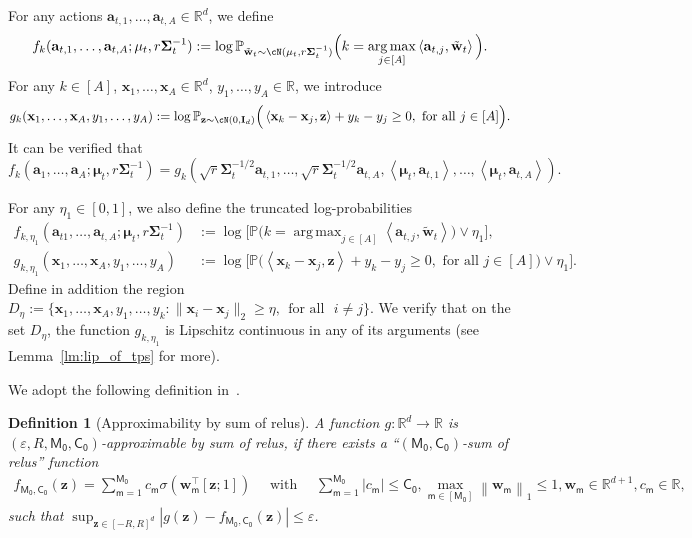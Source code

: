 \documentclass[10pt]{article}
\newtheorem{definition}[theorem]{Definition}
\newcommand{\id}{\bI}
\newcommand{\eps}{\varepsilon}
\DeclareMathOperator*{\argmax}{arg\,max}
\newcommand{\<}{\left\langle}
\renewcommand{\>}{\right\rangle}
\renewcommand{\P}{\mathbb{P}}
\newcommand{\R}{\mathbb{R}}
\newcommand{\Tpsmean}{{{\mathbf\mu}}}
\newcommand{\Tpscov}{{{\mathbf\Sigma}}}
\newcommand{\Tpssam}{{\tilde\bw}}
\newcommand{\Tpsparn}{{r}}
\newcommand{\trunprob}{{\eta_1}}
\newcommand{\Trunreg}{{D}}
\newcommand{\Trunregp}{{\eta}}
\newcommand{\ssm}{{\mathsf{m}}}
\newcommand{\neuron}{{\mathsf{M_0}}}
\newcommand{\weightn}{{{\mathsf{C_0}}}}
\def\bI{{\mathbf I}}
\def\ba{{\mathbf a}}
\def\bw{{\mathbf w}}
\def\bx{{\mathbf x}}
\def\bz{{\mathbf z}}
\begin{document}
For any actions $\ba_{t,1},\ldots,\ba_{t,A}\in\R^{d}$, we define
\begin{align*}
f_k(\ba_{t,1},\ldots,\ba_{t,A};\Tpsmean_t,\Tpsparn\Tpscov_t^{-1}):=\log\P_{\Tpssam_t\sim\cN(\Tpsmean_t,\Tpsparn\Tpscov_t^{-1})}\Big(k =\argmax_{j\in[A]}\<\ba_{t,j},\Tpssam_t\>\Big).
\end{align*}
For any $k\in[A]$, $\bx_1,\ldots,\bx_A\in\R^{d}$, $y_1,\ldots,y_A\in\R$, we introduce $$
g_k(\bx_1,\ldots,\bx_A,y_1,\ldots,y_A):=\log\P_{\bz\sim\cN(0,\id_d)} \Big(\<\bx_k-\bx_j,\bz\>+y_k-y_j\geq0,\text{~for all~}j\in[A] \Big).
$$
It can be verified that $$f_k(\ba_1,\ldots,\ba_A;\Tpsmean_t,\Tpsparn\Tpscov_t^{-1})=g_k(\sqrt{\Tpsparn}\Tpscov_t^{-1/2}\ba_{t,1},\ldots,\sqrt{\Tpsparn}\Tpscov_t^{-1/2}\ba_{t,A},\<\Tpsmean_t,\ba_{t,1}\>,\ldots,\<\Tpsmean_t,\ba_{t,A}\>).$$

For any $\trunprob\in[0,1]$, we also define the truncated log-probabilities
\begin{align*}
f_{k,\trunprob}(\ba_{t1},\ldots,\ba_{t,A};\Tpsmean_t,\Tpsparn\Tpscov_t^{-1})&:=\log\Big[\P \Big( k =\argmax_{j \in[A]}\<\ba_{t,j},\Tpssam_t\> \Big)\vee\trunprob \Big],\\
g_{k,\trunprob}(\bx_1,\ldots,\bx_A,y_1,\ldots,y_A)&:=\log \Big[ \P \Big(\<\bx_k-\bx_j,\bz\>+y_k-y_j\geq0,\text{~for all~}j\in[A] \Big) \vee \trunprob \Big].
\end{align*}
Define in addition the region $\Trunreg_{\Trunregp}:=\{\bx_1,\ldots,\bx_A,y_1,\ldots,y_k: \|\bx_i-\bx_j\|_2\geq\Trunregp,~~\text{for all~~} i\neq j\}$. We verify that on the set $\Trunreg_\Trunregp$, the function $g_{k,\trunprob}$ is Lipschitz continuous in any of its arguments (see Lemma~\ref{lm:lip_of_tps} for more).

We adopt the following definition in~\cite{bai2023transformers}.
\begin{definition}[Approximability by sum of relus]\label{def:general_mlp_approx_new}
     A function $g: \mathbb{R}^d \rightarrow \mathbb{R}$ is $(\eps, R, \neuron, \weightn)$-approximable by sum of relus, if there exists a ``$(\neuron, \weightn)$-sum of relus'' function
\begin{align*}
f_{\neuron, \weightn}(\mathbf{z})=\sum_{\ssm=1}^\neuron c_\ssm \sigma\left(\mathbf{w}_\ssm^{\top}[\mathbf{z} ; 1]\right) \quad \text { with } \quad \sum_{\ssm=1}^\neuron\left|c_\ssm\right| \leq \weightn, \max _{\ssm \in[\neuron]}\left\|\mathbf{w}_\ssm\right\|_1 \leq 1, \mathbf{w}_\ssm \in \mathbb{R}^{d+1},c_\ssm \in \mathbb{R},~
\end{align*}
such that $\sup _{\mathbf{z} \in[-R, R]^d}\left|g(\mathbf{z})-f_{\neuron,\weightn}(\mathbf{z})\right| \leq \eps$.






\end{definition}
\end{document}
